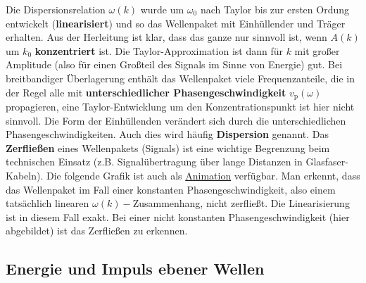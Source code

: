 		  Die Dispersionsrelation \(\omega( k)\) wurde um \(\omega_0\) nach Taylor bis zur ersten Ordung entwickelt (\textbf{linearisiert}) und so das Wellenpaket mit Einhüllender und Träger erhalten. Aus der Herleitung ist klar, dass das ganze nur sinnvoll ist, wenn \(A(k)\) um \(k_0\) \textbf{konzentriert} ist. Die Taylor-Approximation ist dann für $k$ mit großer Amplitude (also für einen Großteil des Signals im Sinne von Energie) gut. Bei breitbandiger Überlagerung enthält das Wellenpaket viele Frequenzanteile, die in der Regel alle mit \textbf{unterschiedlicher Phasengeschwindigkeit} \( v_\mathrm{p}(\omega)\) propagieren, eine Taylor-Entwicklung um den Konzentrationspunkt ist hier nicht sinnvoll. Die Form der Einhüllenden verändert sich durch die unterschiedlichen Phasengeschwindigkeiten. Auch dies wird häufig \textbf{Dispersion} genannt. Das \textbf{Zerfließen} eines Wellenpakets (Signals) ist eine wichtige Begrenzung beim technischen Einsatz (z.B. Signalübertragung über lange Distanzen in Glasfaser-Kabeln). Die folgende Grafik ist auch als \href{https://github.com/hgkdd/TET/tree/main/programs/wave_packet_dispersion}{Animation} verfügbar. Man erkennt, dass das Wellenpaket im Fall einer konstanten Phasengeschwindigkeit, also einem tatsächlich linearen $\omega(k)-$Zusammenhang, nicht zerfließt. Die Linearisierung ist in diesem Fall exakt. Bei einer nicht konstanten Phasengeschwindigkeit (hier abgebildet) ist das Zerfließen zu erkennen.
	  \begin{center}
		  \resizebox{0.6\textwidth}{!}{}
	  \end{center}
	  \subsection{Energie und Impuls ebener Wellen}
